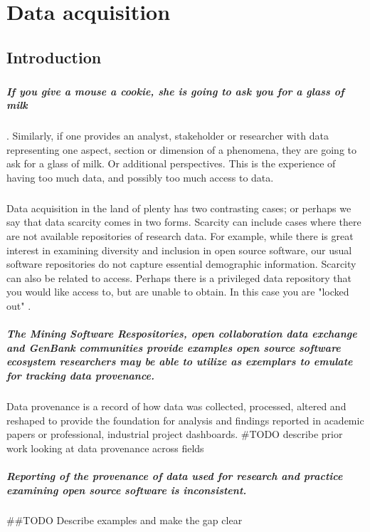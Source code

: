 \chapter{Data acquisition}
\section{Introduction}
\paragraph{} 
\paragraph{If you give a mouse a cookie, she is going to ask you for a glass of milk}\cite{numeroff_if_1985}. Similarly, if one provides an analyst, stakeholder or researcher with data representing one aspect, section or dimension of a phenomena, they are going to ask for a glass of milk. Or additional perspectives. This is the experience of having too much data, and possibly too much access to data. 
\paragraph{} Data acquisition in the land of plenty has two contrasting cases; or perhaps we say that data scarcity comes in two forms. Scarcity can include cases where there are not available repositories of research data. For example, while there is great interest in examining diversity and inclusion in open source software, our usual software repositories do not capture essential demographic information. Scarcity can also be related to access. Perhaps there is a privileged data repository that you would like access to, but are unable to obtain. In this case you are "locked out" \cite{goggins_group_2013}. 
\paragraph{The Mining Software Respositories, open collaboration data exchange and GenBank communities provide examples open source software ecosystem researchers may be able to utilize as exemplars to emulate for tracking data provenance.}  Data provenance is a record of how data was collected, processed, altered and reshaped to provide the foundation for analysis and findings reported in academic papers or professional, industrial project dashboards. \#TODO describe prior work looking at data provenance across fields
\paragraph{Reporting of the provenance of data used for research and practice examining open source software is inconsistent.} \#\#TODO Describe examples and make the gap clear
